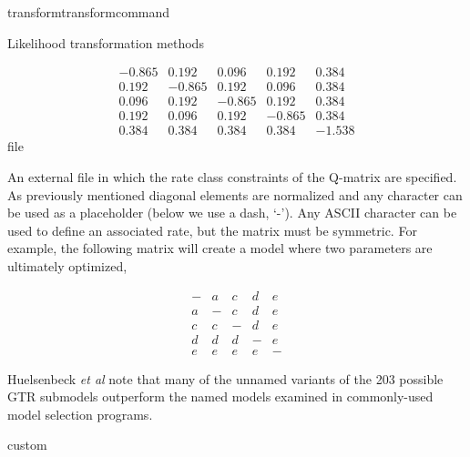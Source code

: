 \begin{command}{transform}{transformcommand}
\begin{arguments}
\begin{argumentgroup}{Likelihood transformation methods}
{\begin{description}
{                        \begin{equation*}
                            \begin{array}{rrrrr}
                                -0.865 &  0.192 &  0.096 &  0.192 &  0.384 \\
                                 0.192 & -0.865 &  0.192 &  0.096 &  0.384 \\
                                 0.096 &  0.192 & -0.865 &  0.192 &  0.384 \\
                                 0.192 &  0.096 &  0.192 & -0.865 &  0.384 \\
                                 0.384 &  0.384 &  0.384 &  0.384 & -1.538
                             \end{array}
                        \end{equation*} }
                        {file}

                        {An external file in which the rate class constraints of
                        the Q-matrix are specified. As previously mentioned
                        diagonal elements are normalized and any character can
                        be used as a placeholder (below we use a dash, `-'). Any
                        ASCII character can be used to define an associated
                        rate, but the matrix must be symmetric. For example, the
                        following matrix will create a model where two
                        parameters are ultimately optimized,

                        \begin{equation*}
                            \begin{array}{ccccc}
                                - & a & c & d & e \\
                                a & - & c & d & e \\
                                c & c & - & d & e \\
                                d & d & d & - & e \\
                                e & e & e & e & -
                             \end{array}
                        \end{equation*}

                        Huelsenbeck \emph{et al} \cite{huelsenbeck2004bayesian}
                        note that many of the unnamed variants of the 203
                        possible GTR submodels outperform the named models
                        examined in commonly-used model selection programs.}
                        {custom}


\end{description}}
\end{argumentgroup}
\end{arguments}
\end{command}

